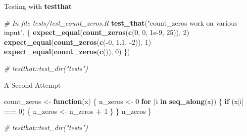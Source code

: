 \documentclass[
  ignorenonframetext,
  aspectratio=1610,
  onlytextwidth]{beamer}
\newenvironment{Shaded}{\begin{snugshade}}{\end{snugshade}}
\newcommand{\CommentTok}[1]{\textcolor[rgb]{0.56,0.35,0.01}{\textit{#1}}}
\newcommand{\ControlFlowTok}[1]{\textcolor[rgb]{0.13,0.29,0.53}{\textbf{#1}}}
\newcommand{\DecValTok}[1]{\textcolor[rgb]{0.00,0.00,0.81}{#1}}
\newcommand{\FloatTok}[1]{\textcolor[rgb]{0.00,0.00,0.81}{#1}}
\newcommand{\FunctionTok}[1]{\textcolor[rgb]{0.13,0.29,0.53}{\textbf{#1}}}
\newcommand{\NormalTok}[1]{#1}
\newcommand{\OtherTok}[1]{\textcolor[rgb]{0.56,0.35,0.01}{#1}}
\newcommand{\SpecialCharTok}[1]{\textcolor[rgb]{0.81,0.36,0.00}{\textbf{#1}}}
\newcommand{\StringTok}[1]{\textcolor[rgb]{0.31,0.60,0.02}{#1}}
\begin{document}
\begin{frame}[fragile]{Testing with \textbf{testthat}}
\label{testing-with-testthat}
\begin{Shaded}
\begin{Highlighting}[]
\CommentTok{\# In file tests/test\_count\_zeros.R}
\FunctionTok{test\_that}\NormalTok{(}\StringTok{"count\_zeros work on various input"}\NormalTok{, \{}
  \FunctionTok{expect\_equal}\NormalTok{(}\FunctionTok{count\_zeros}\NormalTok{(}\FunctionTok{c}\NormalTok{(}\DecValTok{0}\NormalTok{, }\DecValTok{0}\NormalTok{, }\FloatTok{1e{-}9}\NormalTok{, }\DecValTok{25}\NormalTok{)), }\DecValTok{2}\NormalTok{)}
  \FunctionTok{expect\_equal}\NormalTok{(}\FunctionTok{count\_zeros}\NormalTok{(}\FunctionTok{c}\NormalTok{(}\SpecialCharTok{{-}}\DecValTok{0}\NormalTok{, }\FloatTok{1.1}\NormalTok{, }\SpecialCharTok{{-}}\DecValTok{2}\NormalTok{)), }\DecValTok{1}\NormalTok{)}
  \FunctionTok{expect\_equal}\NormalTok{(}\FunctionTok{count\_zeros}\NormalTok{(}\FunctionTok{c}\NormalTok{()), }\DecValTok{0}\NormalTok{)}
\NormalTok{\})}
\end{Highlighting}
\end{Shaded}

\begin{Shaded}
\begin{Highlighting}[]
\CommentTok{\# testthat::test\_dir("tests")}
\end{Highlighting}
\end{Shaded}
\end{frame}

\begin{frame}[fragile]{A Second Attempt}
\label{a-second-attempt}
\begin{Shaded}
\begin{Highlighting}[]
\NormalTok{count\_zeros }\OtherTok{\textless{}{-}} \ControlFlowTok{function}\NormalTok{(x) \{}
\NormalTok{  n\_zeros }\OtherTok{\textless{}{-}} \DecValTok{0}
  \ControlFlowTok{for}\NormalTok{ (i }\ControlFlowTok{in} \FunctionTok{seq\_along}\NormalTok{(x)) \{}
    \ControlFlowTok{if}\NormalTok{ (x[i] }\SpecialCharTok{==} \DecValTok{0}\NormalTok{) \{}
\NormalTok{      n\_zeros }\OtherTok{\textless{}{-}}\NormalTok{ n\_zeros }\SpecialCharTok{+} \DecValTok{1}
\NormalTok{    \}}
\NormalTok{  \}}
\NormalTok{  n\_zeros}
\NormalTok{\}}
\end{Highlighting}
\end{Shaded}

\begin{Shaded}
\begin{Highlighting}[]
\CommentTok{\# testthat::test\_dir("tests")}
\end{Highlighting}
\end{Shaded}
\end{frame}
\end{document}
